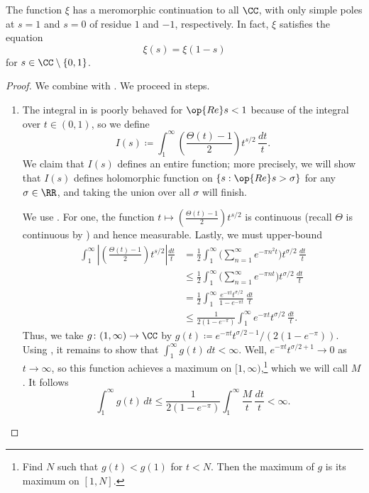 \documentclass[../notes.tex]{subfiles}
\begin{document}
\begin{theorem} \label{thm:xi-func-eq}
	The function $\xi$ has a meromorphic continuation to all $\CC$, with only simple poles at $s=1$ and $s=0$ of residue $1$ and $-1$, respectively. In fact, $\xi$ satisfies the equation
	\[\xi(s)=\xi(1-s)\]
	for $s\in\CC\setminus\{0,1\}$.
\end{theorem}
\begin{proof}
	We combine  with . We proceed in steps.
	\begin{enumerate}
		\item The integral in  is poorly behaved for $\op{Re}s<1$ because of the integral over $t\in(0,1)$, so we define
		\[I(s)\coloneqq\int_1^\infty\left(\frac{\Theta(t)-1}2\right)t^{s/2}\,\frac{dt}t.\]
		We claim that $I(s)$ defines an entire function; more precisely, we will show that $I(s)$ defines holomorphic function on $\{s:\op{Re}s>\sigma\}$ for any $\sigma\in\RR$, and taking the union over all $\sigma$ will finish.
		
		We use . For one, the function $t\mapsto\left(\frac{\Theta(t)-1}2\right)t^{s/2}$ is continuous (recall $\Theta$ is continuous by ) and hence measurable. Lastly, we must upper-bound
		\begin{align*}
			\int_1^\infty\left|\left(\frac{\Theta(t)-1}2\right)t^{s/2}\right|\frac{dt}t &= \frac12\int_1^\infty\Bigg(\sum_{n=1}^\infty e^{-\pi n^2t}\Bigg)t^{\sigma/2}\,\frac{dt}t \\
			&\le \frac12\int_1^\infty\Bigg(\sum_{n=1}^\infty e^{-\pi nt}\Bigg)t^{\sigma/2}\,\frac{dt}t \\
			&= \frac12\int_1^\infty\frac{e^{-\pi t}t^{\sigma/2}}{1-e^{-\pi t}}\,\frac{dt}t \\
			&\le \frac1{2\left(1-e^{-\pi}\right)}\int_1^\infty e^{-\pi t}t^{\sigma/2}\,\frac{dt}t.
		\end{align*}
		Thus, we take $g\colon(1,\infty)\to\CC$ by $g(t)\coloneqq e^{-\pi t}t^{\sigma/2-1}/\left(2\left(1-e^{-\pi}\right)\right)$. Using , it remains to show that $\int_1^\infty g(t)\,dt<\infty$. Well, $e^{-\pi t}t^{\sigma/2+1}\to0$ as $t\to\infty$, so this function achieves a maximum on $[1,\infty)$,\footnote{Find $N$ such that $g(t)<g(1)$ for $t<N$. Then the maximum of $g$ is its maximum on $[1,N]$.} which we will call $M$. It follows
		\[\int_1^\infty g(t)\,dt\le\frac1{2\left(1-e^{-\pi}\right)}\int_1^\infty\frac Mt\,\frac{dt}t<\infty.\]
	

\end{enumerate}
\end{proof}
\end{document}
